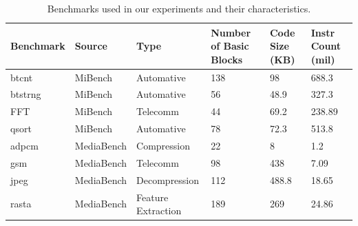 \begin{table}
\begin{center}
\caption{Benchmarks used in our experiments and their characteristics.} 
\begin{tabular}{ p{1.2cm} p{2.2cm} p{2.2cm} p{1cm} p{0.5cm} p{0.6cm} }
 Benchmark& Source & Type & Number of Basic Blocks& Code Size (KB)& Instr Count (mil)\\
 \hline
 btcnt& MiBench \cite{MiBench:2001} & Automative &  138 &  98 &  688.3 \\
 btstrng& MiBench \cite{MiBench:2001} & Automative&  56 &  48.9 &  327.3 \\
 FFT& MiBench \cite{MiBench:2001} & Telecomm & 44 & 69.2 & 238.89 \\
 qsort& MiBench \cite{MiBench:2001} & Automative & 78 &  72.3 &  513.8 \\
 adpcm& MediaBench \cite{MediaBench:1997} & Compression & 22 & 8 & 1.2\\
 gsm& MediaBench \cite{MediaBench:1997} & Telecomm & 98  &  438   &  7.09  \\
 jpeg& MediaBench \cite{MediaBench:1997} & Decompression &  112  &  488.8  &  18.65  \\
 rasta& MediaBench \cite{MediaBench:1997} & Feature Extraction &  189  &   269  &  24.86   \\
\end{tabular}
\end{center}
\end{table}
